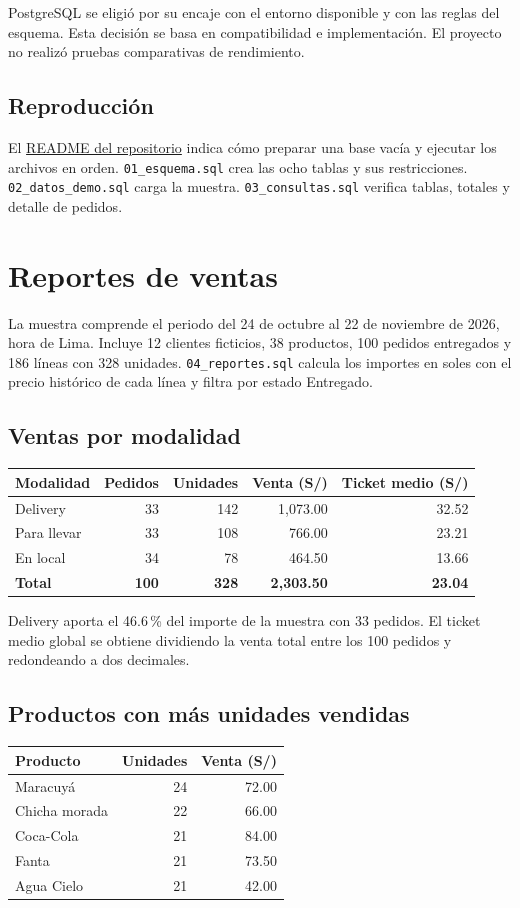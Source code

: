 \documentclass[12pt,a4paper]{article}
\newcommand{\campo}[1]{\texttt{#1}}
\newcommand{\repo}{https://github.com/Quetzalq4321q/trabajo-final-base-de-datos}
\begin{document}
PostgreSQL se eligió por su encaje con el entorno disponible y con las reglas del esquema. Esta decisión se basa en compatibilidad e implementación. El proyecto no realizó pruebas comparativas de rendimiento.

\subsection{Reproducción}
El \href{\repo\#reproducir-la-base-de-datos}{README del repositorio} indica cómo preparar una base vacía y ejecutar los archivos en orden. \campo{01\_esquema.sql} crea las ocho tablas y sus restricciones. \campo{02\_datos\_demo.sql} carga la muestra. \campo{03\_consultas.sql} verifica tablas, totales y detalle de pedidos.

\clearpage
\section{Reportes de ventas}

La muestra comprende el periodo del 24 de octubre al 22 de noviembre de 2026, hora de Lima. Incluye 12 clientes ficticios, 38 productos, 100 pedidos entregados y 186 líneas con 328 unidades. \campo{04\_reportes.sql} calcula los importes en soles con el precio histórico de cada línea y filtra por estado Entregado.

\subsection{Ventas por modalidad}
\begin{tabularx}{\linewidth}{@{}Yrrrr@{}}
\toprule
\textbf{Modalidad} & \textbf{Pedidos} & \textbf{Unidades} & \textbf{Venta (S/)} & \textbf{Ticket medio (S/)}\\
\midrule
Delivery & 33 & 142 & 1,073.00 & 32.52\\
Para llevar & 33 & 108 & 766.00 & 23.21\\
En local & 34 & 78 & 464.50 & 13.66\\
\midrule
\textbf{Total} & \textbf{100} & \textbf{328} & \textbf{2,303.50} & \textbf{23.04}\\
\bottomrule
\end{tabularx}

Delivery aporta el 46.6\,\% del importe de la muestra con 33 pedidos. El ticket medio global se obtiene dividiendo la venta total entre los 100 pedidos y redondeando a dos decimales.

\subsection{Productos con más unidades vendidas}
\begin{tabularx}{\linewidth}{@{}Yrr@{}}
\toprule
\textbf{Producto} & \textbf{Unidades} & \textbf{Venta (S/)}\\
\midrule
Maracuyá & 24 & 72.00\\
Chicha morada & 22 & 66.00\\
Coca-Cola & 21 & 84.00\\
Fanta & 21 & 73.50\\
Agua Cielo & 21 & 42.00\\
\bottomrule
\end{tabularx}
\end{document}
